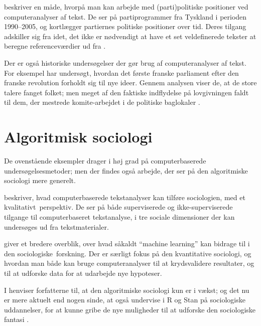 \citeauthor{slapinScalingModelEstimating2008} beskriver en måde, hvorpå man kan arbejde med (parti)politiske positioner ved computeranalyser af tekst.
De ser på partiprogrammer fra Tyskland i perioden 1990--2005, og kortlægger partiernes politiske positioner over tid.
Deres tilgang adskiller sig fra \citeauthor{laverExtractingPolicyPositions2003} idet, det ikke er nødvendigt at have et set veldefinerede tekster at beregne referenceværdier ud fra \autocite{slapinScalingModelEstimating2008}.

Der er også historiske undersøgelser der gør brug af computeranalyser af tekst.
For eksempel har \citeauthor{barronIndividualsInstitutionsInnovation2018} undersøgt, hvordan det første franske parliament efter den franske revolution forholdt sig til nye ideer.
Gennem analysen viser de, at de store talere fanget folket; men meget af den faktiske indflydelse på lovgivningen faldt til dem, der mestrede komite-arbejdet i de politiske baglokaler \autocite{barronIndividualsInstitutionsInnovation2018}. 

\section{Algoritmisk sociologi}\label{sec:review-compsoc}
De ovenstående eksempler drager i høj grad på computerbaserede undersøgelsesmetoder; men der findes også arbejde, der ser på den algoritmiske sociologi mere generelt.

\cite{evansMachineTranslationMining2016} beskriver, hvad computerbaserede tekstanalyser kan tilføre sociologien, med et kvalitativt~perspektiv.
De ser på både superviserede og ikke-superviserede tilgange til computerbaseret tekstanalyse, i tre sociale dimensioner der kan undersøges ud fra tekstmaterialer.

 \cite{molinaMachineLearningSociology2019} giver et bredere overblik, over hvad såkaldt “machine learning” kan bidrage til i den sociologiske~forskning.
Der er særligt fokus på den kvantitative sociologi, og hvordan man både kan bruge computeranalyser til at krydsvalidere resultater, og til at udforske data for at udarbejde nye hypoteser.

I  henviser forfatterne til, at den algoritmiske sociologi kun er i vækst; og det nu er mere aktuelt end nogen sinde, at også undervise i R og Stan på sociologiske uddannelser, for at kunne gribe de nye muligheder til at udforske den sociologiske fantasi \autocite{evansComputationSociologicalImagination2019}.

